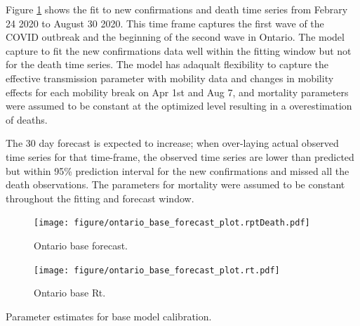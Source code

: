 \documentclass[12pt]{article}\usepackage[]{graphicx}\usepackage[]{color}
\begin{document}
Figure \ref{fig:Ont_calibration_base_forecast} shows the fit to new confirmations and death time series from Febrary 24 2020 to August 30 2020. This time frame captures the first wave of the COVID outbreak and the beginning of the second wave in Ontario. The model capture to fit the new confirmations data well within the fitting window but not for the death time series. The model has adaqualt flexibility to capture the effective transmission parameter with mobility data and changes in mobility effects for each mobility break on Apr 1st and Aug 7, and mortality parameters were assumed to be constant at the optimized level resulting in a overestimation of deaths. 

The 30 day forecast is expected to increase; when over-laying actual observed time series for that time-frame, the observed time series are lower than predicted but within 95\% prediction interval for the new confirmations and missed all the death observations. The parameters for mortality were assumed to be constant throughout the fitting and forecast window. 


\begin{figure}[ht!]
\texttt{[image: figure/ontario\_base\_forecast\_plot.rptDeath.pdf]}

\caption{Ontario base forecast. }
\label{fig:Ont_calibration_base_forecast}
\end{figure}

\begin{figure}[ht!]
\texttt{[image: figure/ontario\_base\_forecast\_plot.rt.pdf]}

\caption{Ontario base Rt. }
\label{fig:Ont_calibration_base_rt}
\end{figure}

\begin{table}
\centering

\caption{
  \label{tab:estparm}
  Parameter estimates for base model calibration. 
}
\end{table}
\end{document}

